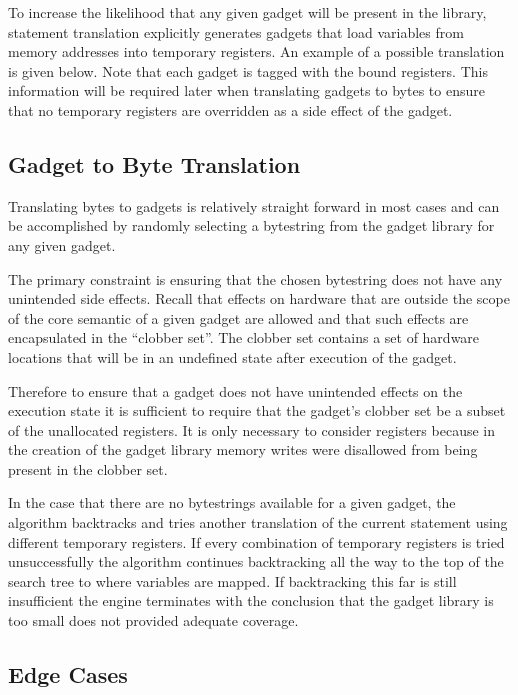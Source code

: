     To increase the likelihood that any given gadget will be present in the
    library, statement translation explicitly generates gadgets that load
    variables from memory addresses into temporary registers. An example of a
    possible translation is given below. Note that each gadget is tagged with
    the bound registers. This information will be required later when
    translating gadgets to bytes to ensure that no temporary registers are
    overridden as a side effect of the gadget.


    \subsection{Gadget to Byte Translation}

    Translating bytes to gadgets is relatively straight forward in most cases
    and can be accomplished by randomly selecting a bytestring from the gadget
    library for any given gadget.

    The primary constraint is ensuring that the chosen bytestring does not have
    any unintended side effects. Recall that effects on hardware that are
    outside the scope of the core semantic of a given gadget are allowed and
    that such effects are encapsulated in the ``clobber set''. The clobber set
    contains a set of hardware locations that will be in an undefined state
    after execution of the gadget.

    Therefore to ensure that a gadget does not have unintended effects on the
    execution state it is sufficient to require that the gadget's clobber set be
    a subset of the unallocated registers. It is only necessary to consider
    registers because in the creation of the gadget library memory writes were
    disallowed from being present in the clobber set.

    In the case that there are no bytestrings available for a given gadget, the
    algorithm backtracks and tries another translation of the current statement
    using different temporary registers. If every combination of temporary
    registers is tried unsuccessfully the algorithm continues backtracking all
    the way to the top of the search tree to where variables are mapped. If
    backtracking this far is still insufficient the engine terminates with the
    conclusion that the gadget library is too small does not provided adequate
    coverage. 

    \subsection{Edge Cases}

